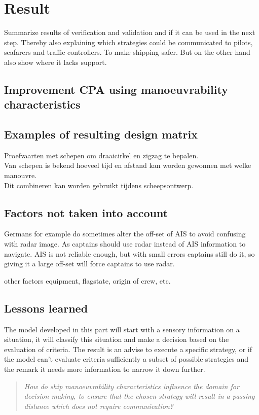 \chapter{Result}
Summarize results of verification and validation and if it can be used in the next step. Thereby also explaining which strategies could be communicated to pilots, seafarers and traffic controllers. To make shipping safer. But on the other hand also show where it lacks support.

\section{Improvement CPA using manoeuvrability characteristics}

\section{Examples of resulting design matrix}
Proefvaarten met schepen om draaicirkel en zigzag te bepalen.\\
Van schepen is bekend hoeveel tijd en afstand kan worden gewonnen met welke manouvre.\\
Dit combineren kan worden gebruikt tijdens scheepsontwerp.\\

\section{Factors not taken into account}
Germans for example do sometimes alter the off-set of AIS to avoid confusing with radar image. As captains should use radar instead of AIS information to navigate. AIS is not reliable enough, but with small errors captains still do it, so giving it a large off-set will force captains to use radar.

other factors equipment, flagstate, origin of crew, etc.

\section{Lessons learned}
The model developed in this part will start with a sensory information on a situation, it will classify this situation and make a decision based on the evaluation of criteria. The result is an advise to execute a specific strategy, or if the model can't evaluate criteria sufficiently a subset of possible strategies and the remark it needs more information to narrow it down further.

\begin{quotation}
	\emph{How do ship manoeuvrability characteristics influence the domain for decision making, to ensure that the chosen strategy will result in a passing distance which does not require communication?} 
\end{quotation}